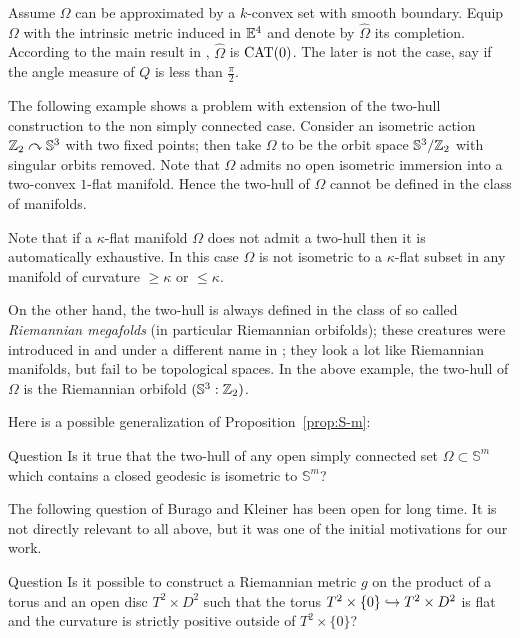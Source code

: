 \documentclass[oneside,a4paper]{article}
\begin{document}
Assume $\Omega$ can be approximated
 by a $k$-convex set with smooth boundary.
Equip $\Omega$ with the intrinsic metric induced in $\mathbb{E}^4$
and denote by $\hat\Omega$ its completion. 
According to the main result in \cite{ABB}, 
$\hat\Omega$ is $\mathrm{CAT}(0)$. 
The later is not the case, say if the angle measure of $Q$ is less than $\tfrac\pi2$.

The following example shows a problem with extension of the
two-hull construction to the  non simply connected case.
Consider an isometric action $\mathbb{Z}_2\curvearrowright\mathbb S^3$ with two fixed points;
then take $\Omega$ to be the orbit space $\mathbb S^3/\mathbb{Z}_2$ with singular orbits removed.
Note that $\Omega$ admits no open isometric immersion into a two-convex $1$-flat manifold.
Hence the two-hull of $\Omega$ cannot be defined in the class of manifolds.

Note that if a $\kappa$-flat manifold $\Omega$ does not admit a two-hull then
it is automatically exhaustive. In this case %
$\Omega$ is not isometric to a $\kappa$-flat subset in any manifold of curvature $\ge \kappa$ or $\le \kappa$.

On the other hand, the two-hull is always defined in the class of so called \emph{Riemannian megafolds} (in particular Riemannian orbifolds);
these creatures were introduced in \cite{petrunin-tuschmann} and under a different name in  \cite{lott};
they look a lot like Riemannian manifolds,
but fail to be topological spaces.
In the above example, the two-hull of $\Omega$ is the Riemannian orbifold $(\mathbb S^3:\mathbb{Z}_2)$. 

Here is a possible generalization of Proposition~\ref{prop:S-m}:

\begin{thm}{Question}
 Is it true that the two-hull of any open simply connected set $\Omega\subset\mathbb S^m$ which contains a closed geodesic is isometric to $\mathbb S^m$?
\end{thm}



The following question of Burago and Kleiner has been open for long time.
It is not directly relevant to all above,
but it was one of the initial motivations for our work.

\begin{thm}{Question}
Is it possible to construct a Riemannian metric $g$ on the product of a
torus and an open disc $T^2\times D^2$
such that the torus $T^2\times \{0\}\z\hookrightarrow T^2\times D^2$ is flat
and the curvature is strictly positive outside of $T^2\times \{0\}$?
\end{thm}
\end{document}
